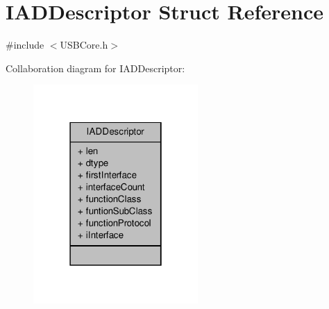 \hypertarget{struct_i_a_d_descriptor}{\section{I\-A\-D\-Descriptor Struct Reference}
\label{struct_i_a_d_descriptor}
}


{\ttfamily \#include $<$U\-S\-B\-Core.\-h$>$}



Collaboration diagram for I\-A\-D\-Descriptor\-:
\nopagebreak
\begin{figure}[H]
\begin{center}
\leavevmode
\includegraphics[width=178pt]{struct_i_a_d_descriptor__coll__graph}
\end{center}
\end{figure}
